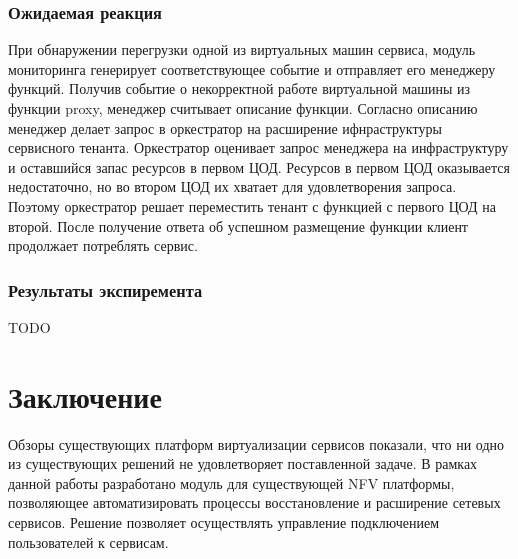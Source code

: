 \documentclass[oneside,final,14pt,a4paper]{extreport}
\begin{document}
\subsection{Ожидаемая реакция}
При обнаружении перегрузки одной из виртуальных машин сервиса, модуль мониторинга генерирует соответствующее событие и отправляет его менеджеру функций. Получив событие о некорректной работе виртуальной машины из функции proxy, менеджер считывает описание функции. Согласно описанию менеджер делает запрос в оркестратор на расширение ифнраструктуры сервисного тенанта. Оркестратор оценивает запрос менеджера на инфраструктуру и оставшийся запас ресурсов в первом ЦОД. Ресурсов в первом ЦОД оказывается недостаточно, но во втором ЦОД их хватает для удовлетворения запроса. Поэтому оркестратор решает переместить тенант с функцией с первого ЦОД на второй. После получение ответа об успешном размещение функции клиент продолжает потреблять сервис.

\subsection{Результаты экспиремента}
TODO





\chapter*{Заключение}
Обзоры существующих платформ виртуализации сервисов показали, что ни одно из существующих решений не удовлетворяет поставленной задаче. В рамках данной работы разработано модуль для существующей NFV платформы, позволяющее автоматизировать процессы восстановление и расширение сетевых сервисов. Решение позволяет осуществлять управление подключением пользователей к сервисам. 
\end{document}
